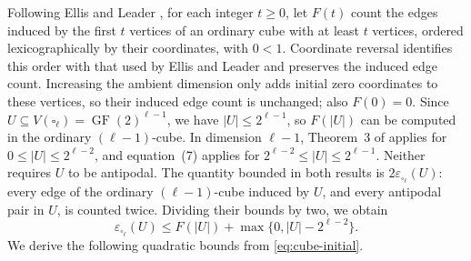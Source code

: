 \documentclass[10pt,a4paper]{article}
\numberwithin{equation}{section}
\DeclareMathOperator{\GF}{GF}
\newcommand{\FF}{\GF(2)}
\begin{document}
Following Ellis and Leader \cite{EllisLeader2018}, for each integer
\(t\ge0\), let \(F(t)\) count the edges induced by the first \(t\)
vertices of an ordinary cube with at least \(t\) vertices, ordered
lexicographically by their coordinates, with \(0<1\).
Coordinate reversal identifies this order with that used by Ellis and Leader
and preserves the induced edge count.
Increasing the ambient dimension only adds initial zero coordinates to these vertices,
so their induced edge count is unchanged; also \(F(0)=0\).
Since \(U\subseteq V(\square_\ell)=\FF^{\ell-1}\), we have
\(|U|\le2^{\ell-1}\), so \(F(|U|)\) can be computed in the
ordinary \((\ell-1)\)-cube.
In dimension \(\ell-1\), Theorem~3 of \cite{EllisLeader2018} applies for
\(0\le|U|\le2^{\ell-2}\), and equation~(7) applies for
\(2^{\ell-2}\le|U|\le2^{\ell-1}\). Neither requires \(U\) to be antipodal.
The quantity bounded in both results is \(2\varepsilon_{\square_\ell}(U)\):
every edge of the ordinary \((\ell-1)\)-cube induced by \(U\),
and every antipodal pair in \(U\), is counted twice.
Dividing their bounds by two, we obtain
\begin{equation}\label{eq:cube-initial}
 \varepsilon_{\square_\ell}(U)
 \le F(|U|)+\max\{0,|U|-2^{\ell-2}\}.
\end{equation}
We derive the following quadratic bounds from \eqref{eq:cube-initial}.
\end{document}
